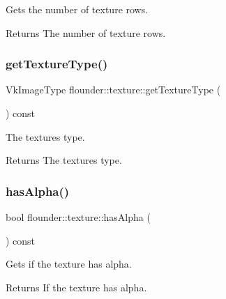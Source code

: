 Gets the number of texture rows. 

\begin{DoxyReturn}{Returns}
The number of texture rows. 
\end{DoxyReturn}
\mbox{\label{classflounder_1_1texture_acf43aa80310fb81f1ffd559b7c3e2434}} 
\subsubsection{\texorpdfstring{get\+Texture\+Type()}{getTextureType()}}
{\footnotesize\ttfamily Vk\+Image\+Type flounder\+::texture\+::get\+Texture\+Type (\begin{DoxyParamCaption}{ }\end{DoxyParamCaption}) const\hspace{0.3cm}{\ttfamily [inline]}}



The textures type. 

\begin{DoxyReturn}{Returns}
The textures type. 
\end{DoxyReturn}
\mbox{\label{classflounder_1_1texture_aa74c0c1cb920f5f131832ec6498eba47}} 
\subsubsection{\texorpdfstring{has\+Alpha()}{hasAlpha()}}
{\footnotesize\ttfamily bool flounder\+::texture\+::has\+Alpha (\begin{DoxyParamCaption}{ }\end{DoxyParamCaption}) const\hspace{0.3cm}{\ttfamily [inline]}}



Gets if the texture has alpha. 

\begin{DoxyReturn}{Returns}
If the texture has alpha. 
\end{DoxyReturn}
\mbox{\label{classflounder_1_1texture_a846a34a57f31c5bae8ad856d589bbd83}} 
